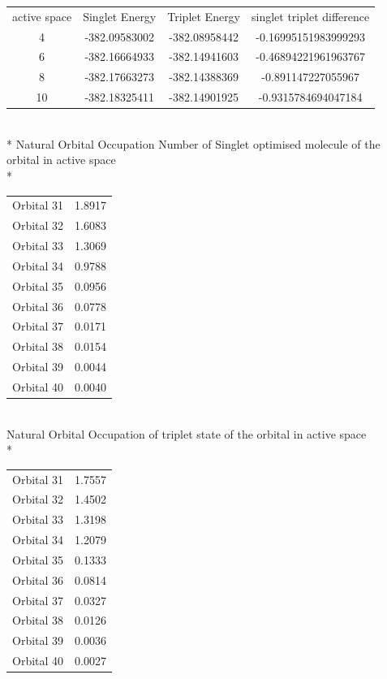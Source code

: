 \documentclass{article}
\begin{document}
 \label{tab:title} 
\begin{tabular}{c c c c}
active space& Singlet Energy &Triplet Energy & singlet triplet difference\\
4 & -382.09583002 & -382.08958442 & -0.16995151983999293\\
6 & -382.16664933 & -382.14941603 & -0.46894221961963767\\
8 & -382.17663273 & -382.14388369 & -0.891147227055967\\
10 & -382.18325411& -382.14901925 & -0.9315784694047184\\
\end{tabular}\\*
Natural Orbital Occupation Number of Singlet optimised molecule of the orbital in active space  \\*

 \label{tab:title} 
\begin{tabular}{c c}
Orbital 31 & 1.8917\\
Orbital 32 & 1.6083\\
Orbital 33 & 1.3069\\
Orbital 34 & 0.9788\\
Orbital 35 & 0.0956\\
Orbital 36 & 0.0778\\
Orbital 37 & 0.0171\\
Orbital 38 & 0.0154\\
Orbital 39 & 0.0044\\
Orbital 40 & 0.0040\\
\end{tabular}\\
Natural  Orbital Occupation of triplet state of the orbital in active space\\*

 \label{tab:title} 
\begin{tabular}{c c}
Orbital 31 & 1.7557\\
Orbital 32 & 1.4502\\
Orbital 33 & 1.3198\\
Orbital 34 & 1.2079\\
Orbital 35 & 0.1333\\
Orbital 36 & 0.0814\\
Orbital 37 & 0.0327\\
Orbital 38 & 0.0126\\
Orbital 39 & 0.0036\\
Orbital 40 & 0.0027\\
\end{tabular}
\end{document}
